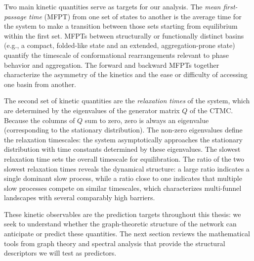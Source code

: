Two main kinetic quantities serve as targets for our analysis. The \emph{mean first-passage time} (MFPT) from one set of states to another is the average time for the system to make a transition between those sets starting from equilibrium within the first set. MFPTs between structurally or functionally distinct basins (e.g., a compact, folded-like state and an extended, aggregation-prone state) quantify the timescale of conformational rearrangements relevant to phase behavior and aggregation. The forward and backward MFPTs together characterize the asymmetry of the kinetics and the ease or difficulty of accessing one basin from another.

The second set of kinetic quantities are the \emph{relaxation times} of the system, which are determined by the eigenvalues of the generator matrix $Q$ of the CTMC. Because the columns of $Q$ sum to zero, zero is always an eigenvalue (corresponding to the stationary distribution). The non-zero eigenvalues define the relaxation timescales: the system asymptotically approaches the stationary distribution with time constants determined by these eigenvalues. The slowest relaxation time sets the overall timescale for equilibration. The ratio of the two slowest relaxation times reveals the dynamical structure: a large ratio indicates a single dominant slow process, while a ratio close to one indicates that multiple slow processes compete on similar timescales, which characterizes multi-funnel landscapes with several comparably high barriers.

These kinetic observables are the prediction targets throughout this thesis: we seek to understand whether the graph-theoretic structure of the network can anticipate or predict these quantities. The next section reviews the mathematical tools from graph theory and spectral analysis that provide the structural descriptors we will test as predictors.

